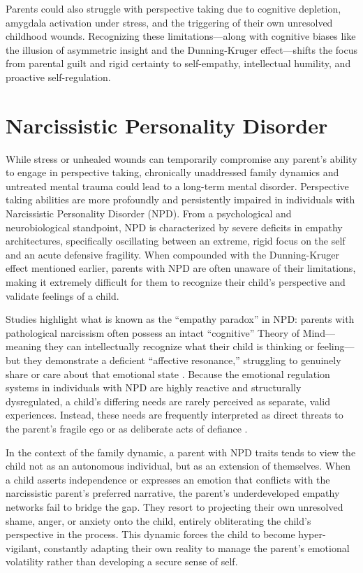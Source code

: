 \begin{keyinsight}
Parents could also struggle with perspective taking due to cognitive depletion, amygdala activation under stress, and the triggering of their own unresolved childhood wounds. 
Recognizing these limitations---along with cognitive biases like the illusion of asymmetric insight and the Dunning-Kruger effect---shifts the focus from parental guilt and rigid certainty to self-empathy, intellectual humility, and proactive self-regulation.
\end{keyinsight}

\section{Narcissistic Personality Disorder}

While stress or unhealed wounds can temporarily compromise any parent's ability to engage in perspective taking, chronically unaddressed family dynamics and untreated mental trauma could lead to a long-term mental disorder. 
Perspective taking abilities are more profoundly and persistently impaired in individuals with Narcissistic Personality Disorder (NPD).
From a psychological and neurobiological standpoint, NPD is characterized by severe deficits in empathy architectures, specifically oscillating between an extreme, rigid focus on the self and an acute defensive fragility.
When compounded with the Dunning-Kruger effect mentioned earlier, parents with NPD are often unaware of their limitations, making it extremely difficult for them to recognize their child's perspective and validate feelings of a child.

Studies highlight what is known as the ``empathy paradox'' in NPD: parents with pathological narcissism often possess an intact ``cognitive'' Theory of Mind---meaning they can intellectually recognize what their child is thinking or feeling---but they demonstrate a deficient ``affective resonance,'' struggling to genuinely share or care about that emotional state \citep{baskin2025, ronningstam2024}.
Because the emotional regulation systems in individuals with NPD are highly reactive and structurally dysregulated, a child's differing needs are rarely perceived as separate, valid experiences.
Instead, these needs are frequently interpreted as direct threats to the parent's fragile ego or as deliberate acts of defiance \citep{day2024}.

In the context of the family dynamic, a parent with NPD traits tends to view the child not as an autonomous individual, but as an extension of themselves.
When a child asserts independence or expresses an emotion that conflicts with the narcissistic parent's preferred narrative, the parent's underdeveloped empathy networks fail to bridge the gap.
They resort to projecting their own unresolved shame, anger, or anxiety onto the child, entirely obliterating the child's perspective in the process.
This dynamic forces the child to become hyper-vigilant, constantly adapting their own reality to manage the parent's emotional volatility rather than developing a secure sense of self.

